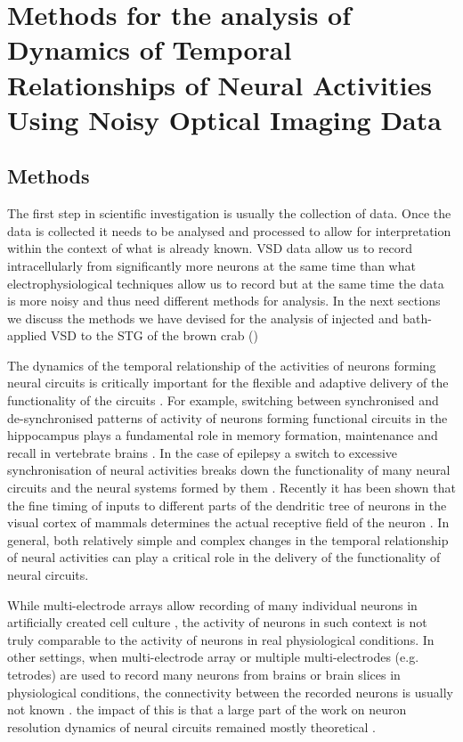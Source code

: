 \chapter{Methods for the analysis of Dynamics of Temporal Relationships of Neural Activities Using Noisy Optical Imaging Data}	
\label{chap:analysis}
\section{Methods}


The first step in scientific investigation is usually the collection of data. Once the data is collected it needs to be analysed and processed to allow for interpretation within the context of what is already known. \ac{VSD} data allow us to record intracellularly from significantly more neurons at the same time than what electrophysiological techniques allow us to record but at the same time the data is more noisy and thus need different methods for analysis. In the next sections we discuss the methods we have devised for the analysis of injected and bath-applied \ac{VSD} to the \ac{STG} of the brown crab ()

The dynamics of the temporal relationship of the activities of neurons forming neural circuits is critically important for the flexible and adaptive delivery of the functionality of the circuits \cite{Harris-Warrick1992,Galan2004,Hill2012,Bruno2015}. For example, switching between synchronised and de-synchronised patterns of activity of neurons forming functional circuits in the hippocampus plays a fundamental role in memory formation, maintenance and recall in vertebrate brains \cite{Axmacher2006,Robbe2006}. In the case of epilepsy a switch to excessive synchronisation of neural activities breaks down the functionality of many neural circuits and the neural systems formed by them \cite{FeldtMuldoon2013, Engel2013}. Recently it has been shown that the fine timing of inputs to different parts of the dendritic tree of neurons in the visual cortex of mammals determines the actual receptive field of the neuron \cite{Chen2013}. In general, both relatively simple and complex changes in the temporal relationship of neural activities can play a critical role in the delivery of the functionality of neural circuits.

While multi-electrode arrays allow recording of many individual neurons in artificially created cell culture \cite{Potter2001, Spira2013}, the activity of neurons in such context is not truly comparable to the activity of neurons in real physiological conditions. In other settings, when multi-electrode array or multiple multi-electrodes (e.g. tetrodes) are used to record many neurons from brains or brain slices in physiological conditions, the connectivity between the recorded neurons is usually not known \cite{Guitchounts2013, Scholvin2015, Santos2012}. the impact of this is that a large part of the work on neuron resolution dynamics of neural circuits remained mostly theoretical \cite{Schneidman2006, Shlens2006, Paninski2010}.

